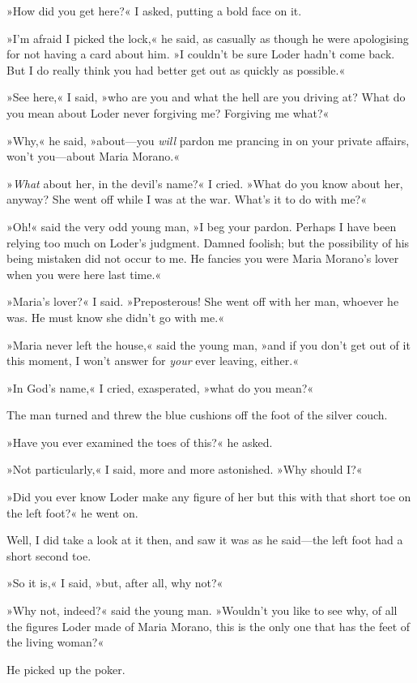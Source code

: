 »How did you get here?« I asked, putting a bold face on it.

»I'm afraid I picked the lock,« he said, as casually as though he were apologising for not having a card about him. »I couldn't be sure Loder hadn't come back. But I do really think you had better get out as quickly as possible.«

»See here,« I said, »who are you and what the hell are you driving at? What do you mean about Loder never forgiving me? Forgiving me what?«

»Why,« he said, »about—you \textit{will} pardon me prancing in on your private affairs, won't you—about Maria Morano.«

»\textit{What} about her, in the devil's name?« I cried. »What do you know about her, anyway? She went off while I was at the war. What's it to do with me?«

»Oh!« said the very odd young man, »I beg your pardon. Perhaps I have been relying too much on Loder's judgment. Damned foolish; but the possibility of his being mistaken did not occur to me. He fancies you were Maria Morano's lover when you were here last time.«

»Maria's lover?« I said. »Preposterous! She went off with her man, whoever he was. He must know she didn't go with me.«

»Maria never left the house,« said the young man, »and if you don't get out of it this moment, I won't answer for \textit{your} ever leaving, either.«

»In God's name,« I cried, exasperated, »what do you mean?«

The man turned and threw the blue cushions off the foot of the silver couch.

»Have you ever examined the toes of this?« he asked.

»Not particularly,« I said, more and more astonished. »Why should I?«

»Did you ever know Loder make any figure of her but this with that short toe on the left foot?« he went on.

Well, I did take a look at it then, and saw it was as he said—the left foot had a short second toe.

»So it is,« I said, »but, after all, why not?«

»Why not, indeed?« said the young man. »Wouldn't you like to see why, of all the figures Loder made of Maria Morano, this is the only one that has the feet of the living woman?«

He picked up the poker.

